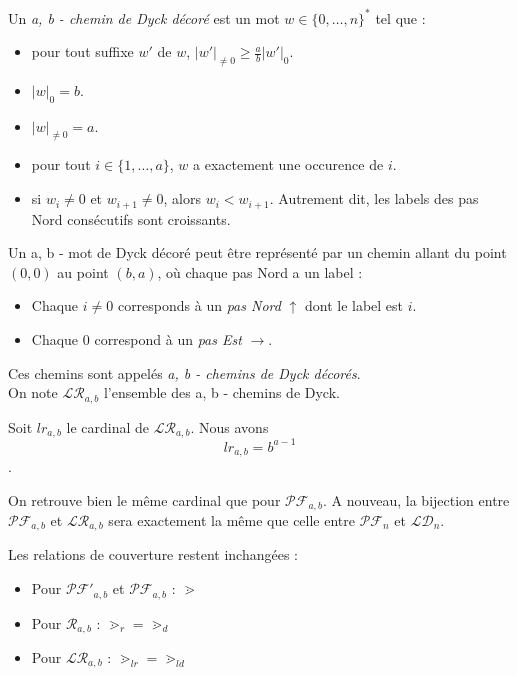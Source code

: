 \begin{definition}
    Un \emph{a, b - chemin de Dyck décoré} est un mot $w \in 
    \{0, \ldots, n\}^*$ tel que :
    \begin{itemize}
        \item pour tout suffixe $w'$ de $w$,
            $\displaystyle|w'|_{\neq 0} \geqslant \frac{a}{b}|w'|_0$.
        \item $|w|_0 = b$.
        \item $|w|_{\neq 0} = a$.
        \item pour tout $i \in \{1, \ldots, a\}$, $w$ a exactement une
            occurence de $i$.
        \item si $w_i \neq 0$ et $w_{i+1} \neq 0$,
            alors $w_i < w_{i+1}$. Autrement dit, les labels des pas Nord
            consécutifs sont croissants.
    \end{itemize}
\end{definition}

Un a, b - mot de Dyck décoré peut être représenté par un chemin allant du
point $(0,0)$ au point $(b,a)$, où chaque pas Nord a un label :
\begin{itemize}
    \item Chaque $i \neq 0$ corresponds à un \emph{pas Nord} $\uparrow$
    dont le label est $i$.
    \item Chaque $0$ correspond à un \emph{pas Est} $\rightarrow$.
\end{itemize}

Ces chemins sont appelés \emph{a, b - chemins de Dyck décorés}.\\
On note $\mathcal{LR}_{a,b}$ l'ensemble des a, b - chemins de Dyck.

\begin{theorem}
    Soit $lr_{a,b}$ le cardinal de $\mathcal{LR}_{a,b}$.
    Nous avons $$lr_{a,b} = b^{a - 1}$$.
\end{theorem}

On retrouve bien le même cardinal que pour $\mathcal{PF}_{a,b}$.
A nouveau, la bijection entre $\mathcal{PF}_{a,b}$ et $\mathcal{LR}_{a,b}$
sera exactement la même que celle entre $\mathcal{PF}_n$ et
$\mathcal{LD}_{n}$.

Les relations de couverture restent inchangées :
\begin{itemize}
    \item Pour $\mathcal{PF'}_{a,b}$ et $\mathcal{PF}_{a,b}$ : $\gtrdot$
    \item Pour $\mathcal{R}_{a,b}$ : $\gtrdot_r = \gtrdot_d$
    \item Pour $\mathcal{LR}_{a,b}$ : $\gtrdot_{lr} = \gtrdot_{ld}$ 
\end{itemize}

